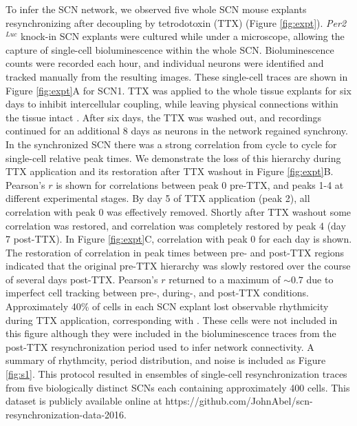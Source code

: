 To infer the SCN network, we observed five whole SCN mouse explants resynchronizing after decoupling by tetrodotoxin (TTX) (Figure \ref{fig:expt}).
\textit{Per2$^{Luc}$} knock-in SCN explants were cultured while under a microscope, allowing the capture of single-cell bioluminescence within the whole SCN.
Bioluminescence counts were recorded each hour, and individual neurons were identified and tracked manually from the resulting images.
These single-cell traces are shown in Figure \ref{fig:expt}A for SCN1.
TTX was applied to the whole tissue explants for six days to inhibit intercellular coupling, while leaving physical connections within the tissue intact \cite{Yamaguchi2003, Webb2009, Buhr2010}.
After six days, the TTX was washed out, and recordings continued for an additional 8 days as neurons in the network regained synchrony.
In the synchronized SCN there was a strong correlation from cycle to cycle for single-cell relative peak times\cite{Yamaguchi2003}.
We demonstrate the loss of this hierarchy during TTX application and its restoration after TTX washout in Figure \ref{fig:expt}B.
Pearson's $r$ is shown for correlations between peak 0 pre-TTX, and peaks 1-4 at different experimental stages.
By day 5 of TTX application (peak 2), all correlation with peak 0 was effectively removed.
Shortly after TTX washout some correlation was restored, and correlation was completely restored by peak 4 (day 7 post-TTX).
In Figure \ref{fig:expt}C, correlation with peak 0 for each day is shown.
The restoration of correlation in peak times between pre- and post-TTX regions indicated that the original pre-TTX hierarchy was slowly restored over the course of several days post-TTX.
Pearson's $r$ returned to a maximum of $\sim 0.7$ due to imperfect cell tracking between pre-, during-, and post-TTX conditions.
Approximately 40\% of cells in each SCN explant lost observable rhythmicity during TTX application, corresponding with \cite{Webb2009}.
These cells were not included in this figure although they were included in the bioluminescence traces from the post-TTX resynchronization period used to infer network connectivity.
A summary of rhythmcity, period distribution, and noise is included as Figure \ref{fig:s1}.
This protocol resulted in ensembles of single-cell resynchronization traces from five biologically distinct SCNs each containing approximately 400 cells.
This dataset is publicly available online at https://github.com/JohnAbel/scn-resynchronization-data-2016.
